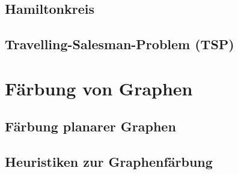 \documentclass[10pt,a4paper,landscape]{article}
\begin{document}
\begin{multicols*}{2}
    \subsection{ Hamiltonkreis }

    \subsection{ Travelling-Salesman-Problem (TSP) }


\section{ Färbung von Graphen }
    \subsection{ Färbung planarer Graphen }

    \subsection{ Heuristiken zur Graphenfärbung }


\end{multicols*}
\end{document}
